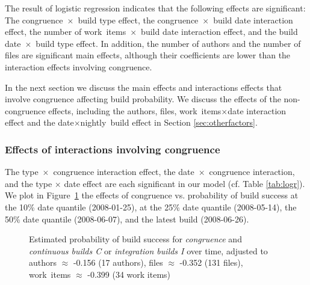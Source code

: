 The result of logistic regression indicates that the following effects are significant: The congruence~$\times$~build type effect, the congruence~$\times$~build date interaction effect, the number of work~items~$\times$~build date interaction effect, and the build date~$\times$~build type effect. In addition, the number of authors and the number of files are significant main effects, although their coefficients are lower than the interaction effects involving congruence.

In the next section we discuss the main effects and interactions effects that involve congruence affecting build probability. We discuss the effects of the non-congruence effects, including the authors, files, work~items$\times$date interaction effect and the date$\times$nightly~build effect in Section \ref{sec:otherfactors}.

\subsubsection{Effects of interactions involving congruence}
\label{sec:congruenceinteractions}
The type~$\times$~congruence interaction effect, the date~$\times$~congruence interaction, and the type $\times$ date effect are each significant in our model (cf. Table \ref{tab:logr}). We plot in Figure~\ref{fig:unweighted_congruence_typeci_age} the effects of congruence vs. probability of build success at the 10\% date quantile (2008-01-25), at the 25\% date quantile (2008-05-14), the 50\% date quantile (2008-06-07), and the latest build (2008-06-26).


\begin{figure}[t!]
\centering
  
  
	\caption{Estimated probability of build success for \emph{congruence} and \emph{continuous builds C} or \emph{integration builds I}  over time, adjusted to authors $\approx$ -0.156 (17 authors), files $\approx$ -0.352 (131 files), work~items $\approx$ -0.399 (34 work items)}
	\label{fig:unweighted_congruence_typeci_age}
\end{figure}

